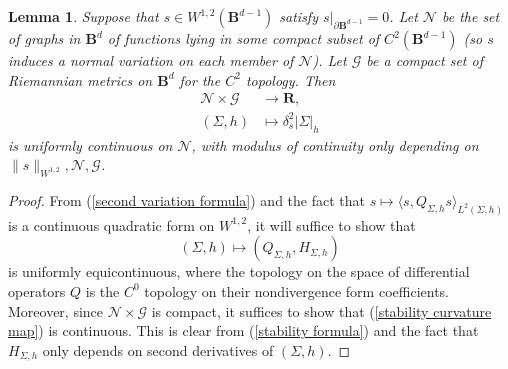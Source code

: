\documentclass[reqno,11pt]{amsart}
\newcommand{\RR}{\mathbf{R}}
\newcommand{\Ball}{\mathbf{B}}
\newtheorem{lemma}[theorem]{Lemma}
\theoremstyle{definition}
\numberwithin{equation}{section}
\begin{document}
\begin{lemma}\label{uniform continuity of stability}
Suppose that $s \in W^{1, 2}(\Ball^{d - 1})$ satisfy $s|_{\partial \Ball^{d - 1}} = 0$.
Let $\mathscr N$ be the set of graphs in $\Ball^d$ of functions lying in some compact subset of $C^2(\Ball^{d - 1})$ (so $s$ induces a normal variation on each member of $\mathscr N$).
Let $\mathscr G$ be a compact set of Riemannian metrics on $\Ball^d$ for the $C^2$ topology.
Then
\begin{align*}
\mathscr N \times \mathscr G &\to \RR, \\
(\Sigma, h) &\mapsto \delta^2_s |\Sigma|_h
\end{align*}
is uniformly continuous on $\mathscr N$, with modulus of continuity only depending on $\|s\|_{W^{1, 2}}, \mathscr N, \mathscr G$.
\end{lemma}
\begin{proof}
From (\ref{second variation formula}) and the fact that $s \mapsto \langle s, Q_{\Sigma, h} s\rangle_{L^2(\Sigma, h)}$ is a continuous quadratic form on $W^{1, 2}$, it will suffice to show that
\begin{equation}\label{stability curvature map}
(\Sigma, h) \mapsto (Q_{\Sigma, h}, H_{\Sigma, h})
\end{equation}
is uniformly equicontinuous, where the topology on the space of differential operators $Q$ is the $C^0$ topology on their nondivergence form coefficients.
Moreover, since $\mathscr N \times \mathscr G$ is compact, it suffices to show that (\ref{stability curvature map}) is continuous.
This is clear from (\ref{stability formula}) and the fact that $H_{\Sigma, h}$ only depends on second derivatives of $(\Sigma, h)$.
\end{proof}
\end{document}

